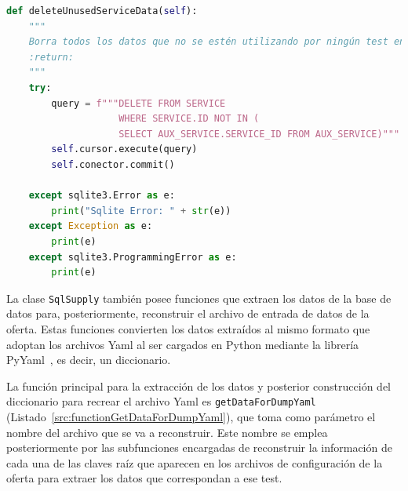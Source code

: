 \begin{lstlisting}[language=Python,
                   style=python,
                   frame=none,
                   numbers=none,
                   basicstyle=\ttfamily\normalsize,
                   caption={Función \texttt{deleteUnusedServiceData}},
                   label=src:functionDeleteUnusedServiceData,
                   inputencoding=utf8]                   
def deleteUnusedServiceData(self):
    """
    Borra todos los datos que no se estén utilizando por ningún test en la tabla SERVICE
    :return:
    """
    try:
        query = f"""DELETE FROM SERVICE
                    WHERE SERVICE.ID NOT IN (
                    SELECT AUX_SERVICE.SERVICE_ID FROM AUX_SERVICE)"""
        self.cursor.execute(query)
        self.conector.commit()

    except sqlite3.Error as e:
        print("Sqlite Error: " + str(e))
    except Exception as e:
        print(e)
    except sqlite3.ProgrammingError as e:
        print(e)
\end{lstlisting}

La clase \texttt{SqlSupply} también posee funciones que extraen los datos de la base de datos para, posteriormente, reconstruir el archivo de entrada de datos de la oferta. Estas funciones convierten los datos extraídos al mismo formato que adoptan los archivos \acrshort{Yaml} al ser cargados en Python mediante la librería PyYaml~\cite{PyYaml}, es decir, un diccionario.  

La función principal para la extracción de los datos y posterior construcción del diccionario para recrear el archivo \acrshort{Yaml} es \texttt{getDataForDumpYaml} (Listado~\ref{src:functionGetDataForDumpYaml}), que toma como parámetro el nombre del archivo que se va a reconstruir. Este nombre se emplea posteriormente por las subfunciones encargadas de reconstruir la información de cada una de las claves raíz que aparecen en los archivos de configuración de la oferta para extraer los datos que correspondan a ese test.

